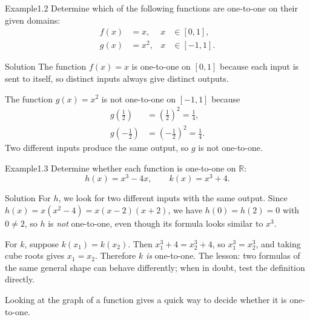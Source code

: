 \documentclass[a4paper,12pt,oneside]{memoir}
\begin{document}
\begin{workedexample}
\begin{envexample}{Example}{1.2}{}
Determine which of the following functions are one-to-one on their given domains: \[ \begin{aligned} f(x) &= x, & x &\in [0, 1],\\ g(x) &= x^{2}, & x &\in [-1, 1]. \end{aligned} \]
\end{envexample}
\begin{envsolution}{Solution}{}{}
The function \(f(x) = x\) is one-to-one on \([0, 1]\) because each input is sent to itself, so distinct inputs always give distinct outputs.

The function \(g(x) = x^{2}\) is not one-to-one on \([-1, 1]\) because \[ \begin{aligned} g\!\left(\tfrac{1}{2}\right) &= \left(\tfrac{1}{2}\right)^{2} = \tfrac{1}{4},\\ g\!\left(-\tfrac{1}{2}\right) &= \left(-\tfrac{1}{2}\right)^{2} = \tfrac{1}{4}. \end{aligned} \] Two different inputs produce the same output, so \(g\) is not one-to-one.
\end{envsolution}
\end{workedexample}
\begin{workedexample}
\begin{envexample}{Example}{1.3}{}
Determine whether each function is one-to-one on \(\mathbb{R}\): \[ h(x) = x^{3} - 4x, \qquad k(x) = x^{3} + 4. \]
\end{envexample}
\begin{envsolution}{Solution}{}{}
For \(h\), we look for two different inputs with the same output. Since \(h(x) = x(x^{2} - 4) = x(x - 2)(x + 2)\), we have \(h(0) = h(2) = 0\) with \(0 \neq 2\), so \(h\) is \emph{not} one-to-one, even though its formula looks similar to \(x^{3}\).

For \(k\), suppose \(k(x_{1}) = k(x_{2})\). Then \(x_{1}^{3} + 4 = x_{2}^{3} + 4\), so \(x_{1}^{3} = x_{2}^{3}\), and taking cube roots gives \(x_{1} = x_{2}\). Therefore \(k\) \emph{is} one-to-one. The lesson: two formulas of the same general shape can behave differently; when in doubt, test the definition directly.
\end{envsolution}
\end{workedexample}
Looking at the graph of a function gives a quick way to decide whether it is one-to-one.
\end{document}
